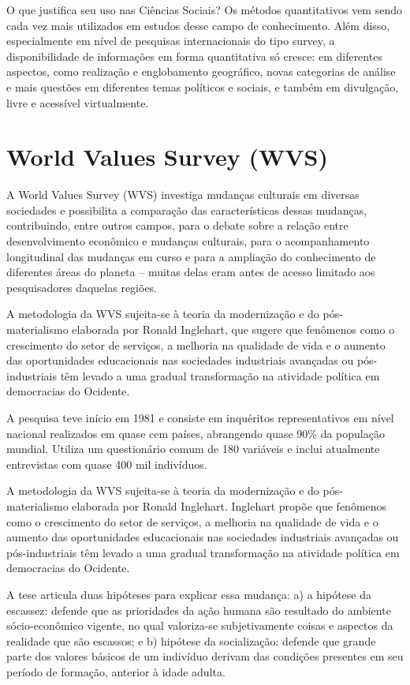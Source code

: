 \documentclass[
  10pt,
  brazil,
  a4paper,
  twoside, notitlepage, openright]{book}
\begin{document}
O que justifica seu uso nas Ciências Sociais? Os métodos quantitativos vem sendo cada vez mais utilizados em estudos desse campo de conhecimento. Além disso, especialmente em nível de pesquisas internacionais do tipo survey, a disponibilidade de informações em forma quantitativa só cresce: em diferentes aspectos, como realização e englobamento geográfico, novas categorias de análise e mais questões em diferentes temas políticos e sociais, e também em divulgação, livre e acessível virtualmente.

\hypertarget{world-values-survey-wvs}{%
\section{World Values Survey (WVS)}\label{world-values-survey-wvs}}

A World Values Survey (WVS) investiga mudanças culturais em diversas sociedades e possibilita a comparação das características dessas mudanças, contribuindo, entre outros campos, para o debate sobre a relação entre desenvolvimento econômico e mudanças culturais, para o acompanhamento longitudinal das mudanças em curso e para a ampliação do conhecimento de diferentes áreas do planeta -- muitas delas eram antes de acesso limitado aos pesquisadores daquelas regiões.

A metodologia da WVS sujeita-se à teoria da modernização e do pós-materialismo elaborada por Ronald Inglehart, que sugere que fenômenos como o crescimento do setor de serviços, a melhoria na qualidade de vida e o aumento das oportunidades educacionais nas sociedades industriais avançadas ou pós-industriais têm levado a uma gradual transformação na atividade política em democracias do Ocidente.

A pesquisa teve início em 1981 e consiste em inquéritos representativos em nível nacional realizados em quase cem países, abrangendo quase 90\% da população mundial. Utiliza um questionário comum de 180 variáveis e inclui atualmente entrevistas com quase 400 mil indivíduos.

A metodologia da WVS sujeita-se à teoria da modernização e do pós-materialismo elaborada por Ronald Inglehart. Inglehart propõe que fenômenos como o crescimento do setor de serviços, a melhoria na qualidade de vida e o aumento das oportunidades educacionais nas sociedades industriais avançadas ou pós-industriais têm levado a uma gradual transformação na atividade política em democracias do Ocidente.

A tese articula duas hipóteses para explicar essa mudança: a) a hipótese da escassez: defende que as prioridades da ação humana são resultado do ambiente sócio-econômico vigente, no qual valoriza-se subjetivamente coisas e aspectos da realidade que são escassos; e b) hipótese da socialização: defende que grande parte dos valores básicos de um indivíduo derivam das condições presentes em seu período de formação, anterior à idade adulta.
\end{document}
